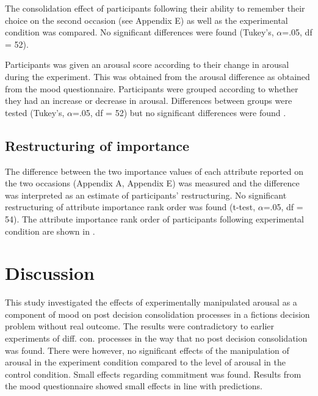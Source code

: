 The consolidation effect of participants following their ability to
remember their choice on the second occasion (see Appendix E) as well
as the experimental condition was compared.   No significant
differences were found (Tukey's, $\alpha$=.05, df = 52).

Participants was given an arousal score according to their change in
arousal during the experiment. This was obtained from the arousal
difference as obtained from the mood questionnaire.  Participants were
grouped according to whether they had an increase or decrease in
arousal.  Differences between groups were tested (Tukey's, $\alpha$=.05, df =
52) but no significant differences were found .


\subsection{Restructuring of importance}

The difference between the two importance values of each attribute
reported on the two occasions (Appendix A, Appendix E) was measured
and the difference was interpreted as an estimate of participants'
restructuring. No significant restructuring  of attribute importance
rank order was found (t-test, $\alpha$=.05, df = 54).  The attribute
importance rank order of participants following experimental condition
are shown in .


\section{Discussion}

This study investigated the effects of experimentally manipulated
arousal as a component of mood on post decision consolidation
processes in a fictions decision problem without real outcome. The
results were contradictory to earlier experiments of
diff. con. processes in the way that  no post decision consolidation
was found.  There were however, no significant effects of the
manipulation of arousal in the experiment condition compared to the
level of arousal in the control condition.  Small effects regarding
commitment was found.   Results from the mood questionnaire showed
small effects in line with predictions.

